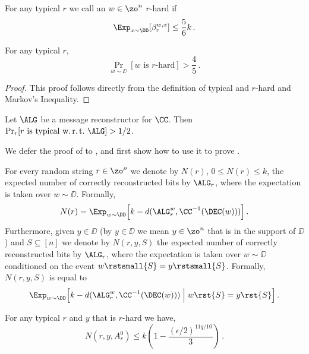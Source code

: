 \begin{definition}
For any typical $r$ we call an $w \in \zo^n$ $r$-hard if
\[
\Exp_{x\sim\DD}[\beta_r^{w,x}]\leq\frac{5}{6}k\,.
\]
\end{definition}

\begin{lemma}\label{lem:rhard} For any typical $r$,
\[
\Pr_{w\sim \DD}[\text{$w$ is $r$-hard}] > \frac{4}{5}\,.
\] 
\end{lemma}

\begin{proof} This proof follows directly from the definition of typical and $r$-hard and Markov's Inequality. 
\end{proof}

\begin{lemma}\label{lem:ent} Let $\ALG$ be a message reconstructor for $\CC$.
%
Then $\Pr_r[\text{$r$ is typical w.\,r.\,t.\ $\ALG$}] > 1/2$.
\end{lemma}

We defer the proof of  to , and first show how to use it to prove .

For every random string $r \in \zo^\rho$ we denote by $N(r)$, $0 \leq
N(r) \leq k$, the expected number of correctly reconstructed bits by
$\ALG_r$, where the expectation is taken over $w \sim \DD$. Formally,
\[
N(r) = \Exp_{w \sim \DD}\Big[k-d(\ALG^w_r,\CC^{-1}(\DEC(w)))\Big]\,.
\]
Furthermore, given $y \in \DD$ (by $y \in \DD$ we mean $y \in \zo^n$ that is in the support of $\DD$) and $S \subseteq [n]$ we denote by $N(r,y,S)$ the expected number of correctly reconstructed bits by $\ALG_r$, where the expectation is taken over $w \sim \DD$ conditioned on the event $w\rstsmall{S} = y\rstsmall{S}$. Formally, $N(r,y,S)$ is equal to $$\Exp_{w \sim \DD}\Bigl[k-d(\ALG^w_r,\CC^{-1}(\DEC(w))) \Bigm| w\rst{S} = y\rst{S}\Bigr]\,.$$


\begin{lemma}\label{lem:ent_0} For any typical $r$ and $y$ that is
  $r$-hard we have,
\[
N(r,y,A_r^0) \leq  k \left(1-\frac{(\epsilon/2)^{11q/10}}{3}\right)\,.
\]
\end{lemma}



